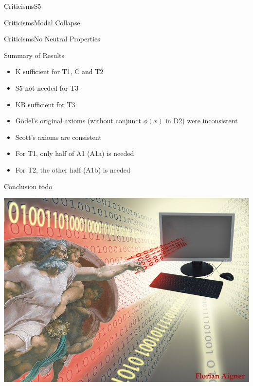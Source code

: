 
\begin{frame}{Criticisms}{S5}

\end{frame}


\begin{frame}{Criticisms}{Modal Collapse}

\end{frame}


\begin{frame}{Criticisms}{No Neutral Properties}

\end{frame}




\begin{frame}{Summary of Results}
\begin{itemize}[<+->]
\item K sufficient for T1, C and T2 
\item S5 not needed for T3
\item KB sufficient for T3 
\item G\"odel's original axioms (without conjunct $\phi(x)$ in D2) were inconsistent
\item Scott's axioms are consistent
\item For T1, only half of A1 (A1a) is needed 
\item For T2, the other half (A1b) is needed
\end{itemize}
\end{frame}


\begin{frame}{Conclusion} \small
todo
\end{frame}

\begin{frame}[plain]
\includegraphics[width=\textwidth]{TUWien-GodComputerC} 
\end{frame}
